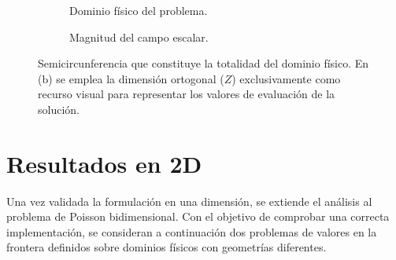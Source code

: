 \documentclass[11pt]{book}
\theoremstyle{plain} %
\theoremstyle{definition} %
\theoremstyle{definition} %
\begin{document}
\begin{figure}[H]
    \captionsetup{skip=5pt}
    \centering
    \begin{subfigure}{0.37\textwidth}
        
        \caption{Dominio físico del problema.}
        \label{subfig:eval_plana}
    \end{subfigure}
    \begin{subfigure}{0.37\textwidth}
        
        \caption{Magnitud del campo escalar.}
        \label{subfig:eval_elevada}
    \end{subfigure}
    \caption{Semicircunferencia que constituye la totalidad del dominio físico. En (b) se emplea la dimensión ortogonal ($Z$) exclusivamente como recurso visual para representar los valores de evaluación de la solución.}
    \label{fig:evaluacion_curva}
\end{figure}

\vspace{-0.5cm}

\section{Resultados en 2D}
\vspace{-0.2cm}

Una vez validada la formulación en una dimensión, se extiende el análisis al problema de Poisson bidimensional. Con el objetivo de comprobar una correcta implementación, se consideran a continuación dos problemas de valores en la frontera definidos sobre dominios físicos con geometrías diferentes.

\vspace{-0.2cm}
\end{document}
